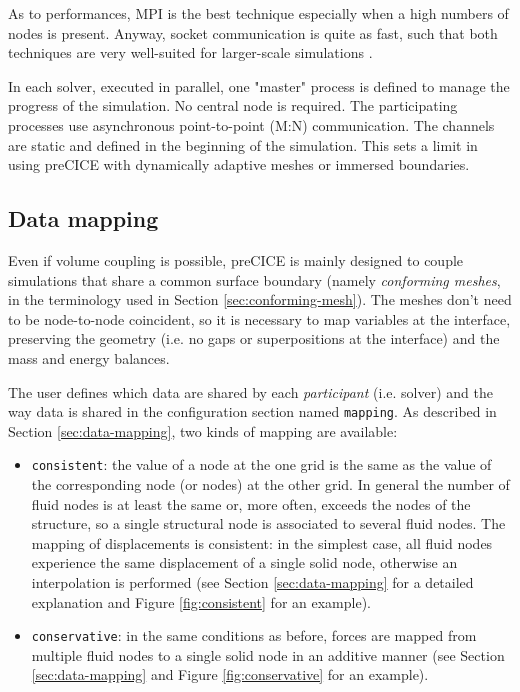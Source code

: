 As to performances, MPI is the best technique especially when a high numbers of nodes is present. Anyway, socket communication is quite as fast, such that
both techniques are very well-suited for larger-scale simulations \cite{gatzhammer2014efficient}.

In each solver, executed in parallel, one "master" process is defined to manage the progress of the simulation. No central node is required. The participating
processes use asynchronous point-to-point (M:N) communication. The channels are static and defined in the beginning of the simulation. This sets a limit in using preCICE with dynamically adaptive meshes or immersed boundaries.

\subsection{Data mapping}
\label{sec:pc-map}

Even if volume coupling is possible, preCICE is mainly designed to couple simulations that share a common surface boundary (namely \textit{conforming meshes}, in the terminology used in Section \ref{sec:conforming-mesh}). The meshes don't need to be node-to-node coincident, so it is necessary to map variables at the interface, preserving the geometry (i.e. no gaps or superpositions at the interface) and the mass and energy balances. 

The user defines which data are shared by each \textit{participant} (i.e. solver) and the way data is shared in the configuration section named \texttt{mapping}. As described in Section \ref{sec:data-mapping}, two kinds of mapping are available:

\begin{itemize}
	\item \texttt{consistent}: the value of a node at the one grid is the same as the value of the corresponding node (or nodes) at the other grid. In general the number of fluid nodes is at least the same or, more often, exceeds the nodes of the structure, so a single structural node is associated to several fluid nodes. The mapping of displacements is consistent: in the simplest case, all fluid nodes experience the same displacement of a single solid node, otherwise an interpolation is performed (see Section \ref{sec:data-mapping} for a detailed explanation and Figure \ref{fig:consistent} for an example).
	\item \texttt{conservative}: in the same conditions as before, forces are mapped from multiple fluid nodes to a single solid node in an additive manner (see Section \ref{sec:data-mapping} and Figure \ref{fig:conservative} for an example).
\end{itemize} 


